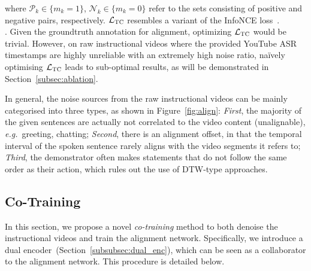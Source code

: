 \noindent where $\mathcal{P}_k \in \{m_k = 1\}$, 
$\mathcal{N}_k \in \{m_k = 0\}$ refer to the sets 
consisting of positive and negative pairs, respectively. 
$\mathcal{L}_{\textsc{TC}}$ resembles a variant of the InfoNCE loss~\cite{Oord18}.\\[-8pt]

. 
Given the groundtruth annotation for alignment,
optimizing $\mathcal{L}_{\textsc{TC}}$ would be trivial.
However, on raw instructional videos 
where the provided YouTube ASR timestamps are highly unreliable 
with an extremely high noise ratio,
na\"ively optimising $\mathcal{L}_{\textsc{TC}}$ leads to sub-optimal results, as will be demonstrated in Section~\ref{subsec:ablation}.

In general, the noise sources from the raw instructional videos 
can be mainly categorised into three types, as shown in Figure~\ref{fig:align}:
\emph{First}, 
the majority of the given sentences are actually not correlated to the video content (unalignable),
{\em e.g.}~greeting, chatting;
\emph{Second}, there is an alignment offset, 
in that the temporal interval of the spoken sentence rarely aligns with the video segments it refers to;
\emph{Third}, the demonstrator  often makes statements that do not follow the same order as their action, 
which rules out the use of DTW-type approaches.

\vspace{-1mm}
\subsection{Co-Training}
\vspace{-2mm}
\label{subsec:cotraining}
In this section, 
we propose a novel {\em co-training} method to both denoise the instructional videos and train the alignment network.
Specifically, we introduce a dual encoder~(Section~\ref{subsubsec:dual_enc}), 
which can be seen as a collaborator to the alignment network. 
This procedure is detailed below.

